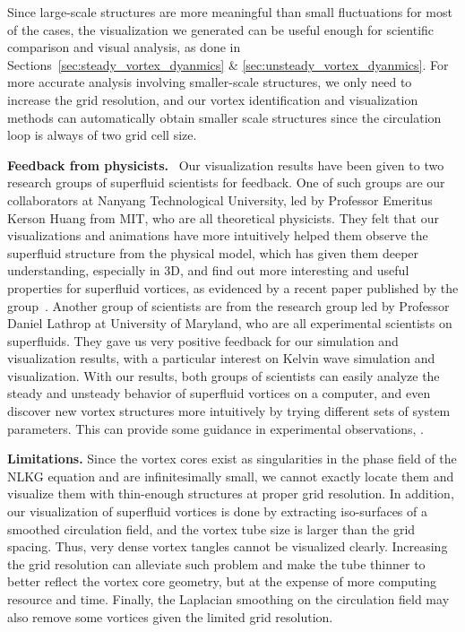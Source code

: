 \documentclass[10pt,journal,compsoc,twoside]{IEEEtran}
\newcommand{\rd}[1]{{\color[rgb]{0.0,0.0,0.0}{#1}}}
\begin{document}
	Since large-scale structures are more meaningful than small fluctuations for most of the cases, the visualization we generated can be useful enough for scientific comparison and visual analysis, as done in Sections~\ref{sec:steady_vortex_dyanmics} \& \ref{sec:unsteady_vortex_dyanmics}.
	For more accurate analysis involving smaller-scale structures, we only need to increase the grid resolution, and our vortex identification and visualization methods can automatically obtain smaller scale structures since the circulation loop is always of two grid cell size.
	
	\vspace{0.1cm}
	\noindent
	\textbf{Feedback from physicists.} \
	Our visualization results have been given to two research groups of superfluid scientists for feedback.
	One of such groups are our collaborators at Nanyang Technological University, led by Professor Emeritus Kerson Huang from MIT, who are all theoretical physicists.
	They felt that our visualizations and animations have more intuitively helped them observe the superfluid structure from the physical model, which has given them deeper understanding, especially in 3D, and find out more interesting and useful properties for superfluid vortices, as evidenced by a recent
	paper published by the group~\cite{PRD_14}.
	Another group of scientists are from the research group led by Professor Daniel Lathrop at University of Maryland, who are all experimental scientists on superfluids.
	They gave us very positive feedback for our simulation and visualization results, with a particular interest on Kelvin wave simulation and visualization.
	With our results, both groups of scientists can easily analyze the steady and unsteady behavior of superfluid vortices on a computer, and even discover new vortex structures more intuitively by trying different sets of system parameters. 
	This can provide some guidance in experimental observations, \rd{which indicates the significance of our simulation and visualization work to help support research in fundamental science}.
	
	
	\vspace{0.1cm}
	\noindent
	\textbf{Limitations.}
	Since the vortex cores exist as singularities in the phase field of the NLKG equation and are infinitesimally small, we cannot exactly locate them and visualize them with thin-enough structures at proper grid resolution.
	In addition, our visualization of superfluid vortices is done by extracting iso-surfaces of a smoothed circulation field, and the vortex tube size is larger than the grid spacing. 
	Thus, very dense vortex tangles cannot be visualized clearly.
	Increasing the grid resolution can alleviate such problem and make the tube thinner to better reflect the vortex core geometry, but at the expense of more computing resource and time.
	Finally, the Laplacian smoothing on the circulation field may also remove some vortices given the limited grid resolution.
	
\end{document}
